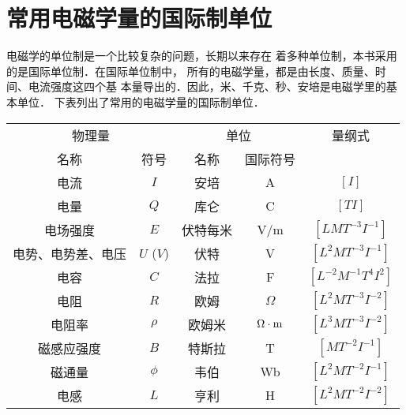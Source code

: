 \chapter{常用电磁学量的国际制单位}

电磁学的单位制是一个比较复杂的问题，长期以来存在
着多种单位制，本书采用的是国际单位制．在国际单位制中，
所有的电磁学量，都是由长度、质量、时间、电流强度这四个基
本量导出的．因此，米、千克、秒、安培是电磁学里的基本单位．
下表列出了常用的电磁学量的国际制单位．

\begin{center}
    \begin{tabular}{cc|cc|c}
  \hline
\multicolumn{2}{c|}{物理量} & \multicolumn{2}{c|}{单位} & 量纲式\\
名称 & 符号 & 名称 & 国际符号 \\
  \hline
电流   &  $I$ & 安培 & A & $[I]$\\
电量    &  $Q$  &  库仑  & C   & $[TI]$   \\
电场强度    &$E$    &  伏特每米  & V/m   &  $[LMT^{-3}I^{-1}]$  \\
电势、电势差、电压& $U$ ($V$)   &  伏特  &  V  &  $[L^2MT^{-3}I^{-1}]$  \\
电容    &  $C$  &  法拉  & F   &  $[L^{-2}M^{-1}T^{4}I^{2}]$   \\
电阻    & $R$  & 欧姆  &  $\Omega$ & $[L^2MT^{-3}I^{-2}]$  \\
电阻率    & $\rho$  & 欧姆米  &  $\Omega\cdot {\rm m}$ & $[L^3MT^{-3}I^{-2}]$  \\
磁感应强度    & $B$  & 特斯拉  & T  &  $[MT^{-2}I^{-1}]$ \\
磁通量    & $\phi$  & 韦伯  & Wb  & $[L^2MT^{-2}I^{-1}]$  \\
电感    & $L$  & 亨利  & H  &  $[L^2MT^{-2}I^{-2}]$ \\
  \hline      
    \end{tabular}
\end{center}

